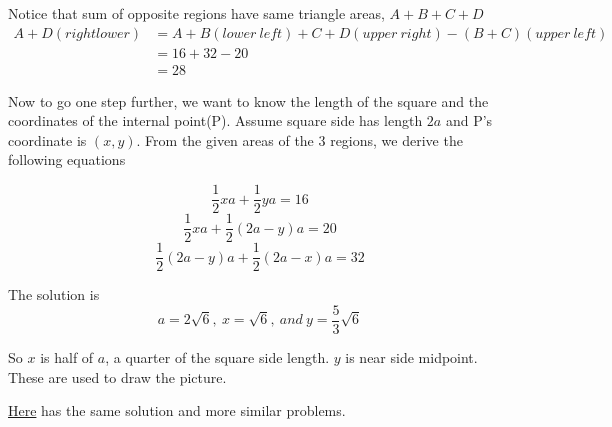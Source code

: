 \documentclass[12pt]{simple_doc}
\begin{document}
    Notice that sum of opposite regions have same triangle areas, $ A + B + C + D$
    \begin{equation*}
		\begin{aligned}
            A + D (right lower) &= A + B (lower\ left) + C + D (upper\ right) - (B + C) (upper\ left)\\
                                &= 16 + 32 - 20\\
                                &= 28
        \end{aligned}
	\end{equation*}

    Now to go one step further, we want to know the length of the square and the coordinates of the
    internal point(P). Assume square side has length $2a$ and P's coordinate is $(x, y)$. From the given
    areas of the 3 regions, we derive the following equations

    \begin{equation*} %
        \frac{1}{2} xa + \frac{1}{2} ya = 16
    \end{equation*}
    \begin{equation*}
        \frac{1}{2} xa + \frac{1}{2} (2a-y)a = 20
    \end{equation*}
    \begin{equation*}
        \frac{1}{2} (2a-y)a + \frac{1}{2} (2a-x)a = 32
    \end{equation*}

    The solution is
    \begin{equation*}
        a = 2\sqrt{6},\ x = \sqrt{6},\ and\ y = \frac{5}{3}\sqrt{6}
    \end{equation*}

    So $x$ is half of $a$, a quarter of the square side length. $y$ is near side midpoint.
    These are used to draw the picture.

    \href{https://mindyourdecisions.com/blog/2018/07/26/solve-for-the-shaded-area-you-should-be-able-to-solve-this/}{Here}
    has the same solution and more similar problems.
\end{document}
